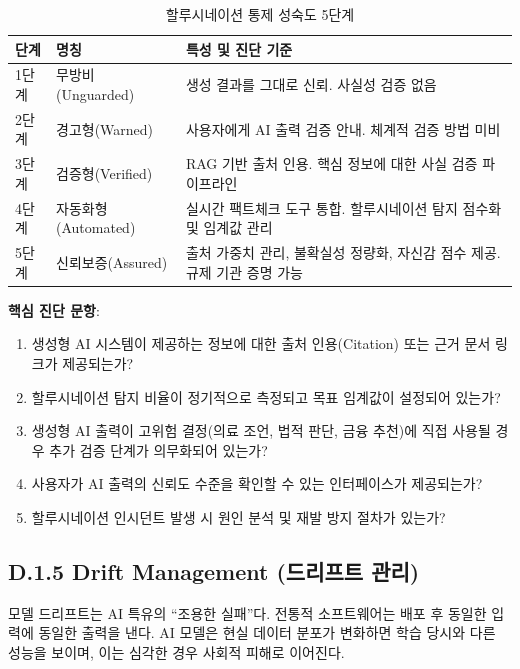 \begin{table}[htbp]
\centering
\caption{할루시네이션 통제 성숙도 5단계}
\label{tab:reliability_maturity}
\begin{tabularx}{\textwidth}{|l|l|X|}
\hline
\textbf{단계} & \textbf{명칭} & \textbf{특성 및 진단 기준} \\ \hline
1단계 & 무방비(Unguarded) & 생성 결과를 그대로 신뢰. 사실성 검증 없음 \\ \hline
2단계 & 경고형(Warned) & 사용자에게 AI 출력 검증 안내. 체계적 검증 방법 미비 \\ \hline
3단계 & 검증형(Verified) & RAG 기반 출처 인용. 핵심 정보에 대한 사실 검증 파이프라인 \\ \hline
4단계 & 자동화형(Automated) & 실시간 팩트체크 도구 통합. 할루시네이션 탐지 점수화 및 임계값 관리 \\ \hline
5단계 & 신뢰보증(Assured) & 출처 가중치 관리, 불확실성 정량화, 자신감 점수 제공. 규제 기관 증명 가능 \\ \hline
\end{tabularx}
\end{table}

\textbf{핵심 진단 문항}:
\begin{enumerate}
    \item 생성형 AI 시스템이 제공하는 정보에 대한 출처 인용(Citation) 또는 근거 문서 링크가 제공되는가?
    \item 할루시네이션 탐지 비율이 정기적으로 측정되고 목표 임계값이 설정되어 있는가?
    \item 생성형 AI 출력이 고위험 결정(의료 조언, 법적 판단, 금융 추천)에 직접 사용될 경우 추가 검증 단계가 의무화되어 있는가?
    \item 사용자가 AI 출력의 신뢰도 수준을 확인할 수 있는 인터페이스가 제공되는가?
    \item 할루시네이션 인시던트 발생 시 원인 분석 및 재발 방지 절차가 있는가?
\end{enumerate}

\subsection*{D.1.5 Drift Management (드리프트 관리)}

모델 드리프트는 AI 특유의 ``조용한 실패''다. 전통적 소프트웨어는 배포 후 동일한 입력에 동일한 출력을 낸다. AI 모델은 현실 데이터 분포가 변화하면 학습 당시와 다른 성능을 보이며, 이는 심각한 경우 사회적 피해로 이어진다.

